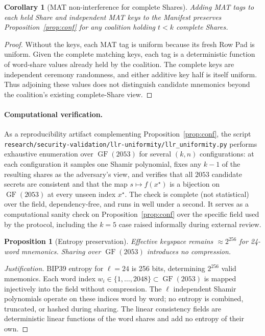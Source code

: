 \documentclass[11pt]{article}
\newcommand{\GF}{\operatorname{GF}}
\newtheorem{proposition}[theorem]{Proposition}
\newtheorem{corollary}[theorem]{Corollary}
\begin{document}
\begin{corollary}[MAT non-interference for complete Shares]
\label{cor:mat-zero}
Adding MAT tags to each held Share and independent MAT keys to the Manifest preserves Proposition~\ref{prop:conf} for any coalition holding $t<k$ complete Shares.
\end{corollary}

\begin{proof}
Without the keys, each MAT tag is uniform because its fresh Row Pad is uniform. Given the complete matching keys, each tag is a deterministic function of word-share values already held by the coalition. The complete keys are independent ceremony randomness, and either additive key half is itself uniform. Thus adjoining these values does not distinguish candidate mnemonics beyond the coalition's existing complete-Share view.
\end{proof}

\paragraph{Computational verification.} As a reproducibility artifact complementing Proposition~\ref{prop:conf}, the script \texttt{research/security-validation/llr-uniformity/llr\_uniformity.py} performs exhaustive enumeration over $\GF(2053)$ for several $(k, n)$ configurations: at each configuration it samples one Shamir polynomial, fixes any $k{-}1$ of the resulting shares as the adversary's view, and verifies that all $2053$ candidate secrets are consistent and that the map $s \mapsto f(x^\star)$ is a bijection on $\GF(2053)$ at every unseen index $x^\star$. The check is complete (not statistical) over the field, dependency-free, and runs in well under a second. It serves as a computational sanity check on Proposition~\ref{prop:conf} over the specific field used by the protocol, including the $k = 5$ case raised informally during external review.

\begin{proposition}[Entropy preservation]
\label{prop:entropy}
Effective keyspace remains $\approx 2^{256}$ for 24-word mnemonics. Sharing over $\GF(2053)$ introduces no compression.
\end{proposition}

\begin{proof}[Justification]
BIP39 entropy for $\ell = 24$ is 256 bits, determining $2^{256}$ valid mnemonics. Each word index $w_i \in \{1, \ldots, 2048\} \subset \GF(2053)$ is mapped injectively into the field without compression. The $\ell$ independent Shamir polynomials operate on these indices word by word; no entropy is combined, truncated, or hashed during sharing. The linear consistency fields are deterministic linear functions of the word shares and add no entropy of their own.
\end{proof}
\end{document}
